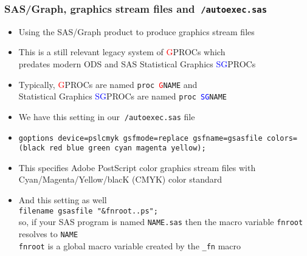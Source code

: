 \documentclass[11pt,pdftex,dvipsnames,usenames,helvetica]{beamer}
\begin{document}
\begin{frame}[fragile]
  \frametitle{SAS/Graph, graphics stream files
and {\tt $~$/autoexec.sas}}
\begin{itemize}
\item Using the SAS/Graph product to produce graphics stream files
\item This is a still relevant legacy system of \textcolor{red}{G}PROCs
  which\\ predates modern ODS and SAS Statistical Graphics
  \textcolor{blue}{SG}PROCs
\item Typically, \textcolor{red}{G}PROCs are named {\tt proc
    \textcolor{red}{G}NAME} and\\ Statistical Graphics
  \textcolor{blue}{SG}PROCs are named {\tt proc \textcolor{blue}{SG}NAME}
\item We have this setting in our {\tt $~$/autoexec.sas} file
\item {\tt goptions device=pslcmyk gsfmode=replace gsfname=gsasfile
    colors=(black red blue green cyan magenta yellow);}
\item This specifies Adobe PostScript color graphics stream files
with Cyan/Magenta/Yellow/blacK (CMYK) color standard
\item And this setting as well\\
 {\tt filename gsasfile "\&fnroot..ps";}\\
so, if your SAS program is named {\tt NAME.sas} then the 
macro variable {\tt fnroot} resolves to {\tt NAME}\\
{\tt fnroot} is a global macro variable created by the {\tt \_fn}
macro
\end{itemize}

\end{frame}
\end{document}
